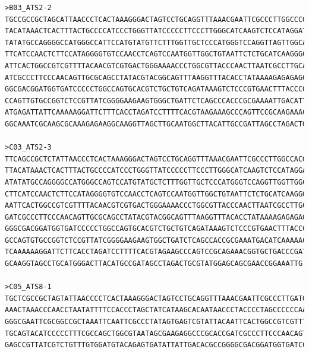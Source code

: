 \begin{verbatim}
>B03_ATS2-2
TGCCGCCGCTAGCATTAACCCTCACTAAAGGGACTAGTCCTGCAGGTTTAAACGAATTCGCCCTTGGCCCGCGTCGACTAGTACTTTTTTTTTTTTTTTTTGTGTTTGTCAAATCCCATT
TACATAAACTCACTTTACTGCCCCATCCCTGGGTTATCCCCCTTCCCTTGGGCATCAAGTCTCCATAGGATTAGGTTCATCCTCTCCCATTGAGGCTAGACAAAGCAGTTCTCTGCTACA
TATATGCCAGGGGCCATGGGCCATTCCATGTATGTTCTTTGGTTGCTCCCATGGGTCCAGGTTAGTTGGCACTGTTGGTTTTCCTATGGTAGTTGCCATCACCTTCAGTTCTTTCAATCC
TTCATCCAACTCTTCCATAGGGGTGTCCAACCTCAGTCCAATGGTTGGCTGTAATTCTCTGCATCAAGGGCAAATTCCCGGCCGCTAAATTCAATTCGCCCTATAGTGAGTCGTATTACA
ATTCACTGGCCGTCGTTTTACAACGTCGTGACTGGGAAAACCCTGGCGTTACCCAACTTAATCGCCTTGCAGCACATCCCCCTTTCGCCAGCTGGCGTAATAGCGAAAAGGCCCGCACCG
ATCGCCCTTCCCAACAGTTGCGCAGCCTATACGTACGGCAGTTTAAGGTTTACACCTATAAAAGAGAGAGCCGTTATCGTCTGTTTGTGGATGTACAGAGTGATATTATTGACACGCCGG
GGCGACGGATGGTGATCCCCCTGGCCAGTGCACGTCTGCTGTCAGATAAAGTCTCCCGTGAACTTTACCCGGTGGTGCATATCGGGGATGAAAGCTGGCGCATGATGACCACCGATATGG
CCAGTTGTGCCGGTCTCCGTTATCGGGGAAGAAGTGGGCTGATTCTCAGCCCACCCGCGAAAATTGACATTCAAAACGCCATTAACCCTGATTGTTTCTGGGAAATATAAATGGTCAGGC
ATGAGATTATTCAAAAAGGATTCTTTCACCTAGATCCTTTTCACGTAAGAAAGCCCAGTTCCGCAAGAAACGGGTGCTTGAACCCGGATGAATTGTTCAGCTTACTGGCTATTCTTGACA
GGCAAATCGCAAGCGCAAAGAGAAGGCAAGGTTAGCTTGCAATGGCTTACATTGCCGATTAGCCTAGACTGCGTTTTATGCACAGGCAAGCGAAACGGAAAATTGGCTCAG

>C03_ATS2-3
TTCAGCCGCTCTATTAACCCTCACTAAAGGGACTAGTCCTGCAGGTTTAAACGAATTCGCCCTTGGCCACGCGTCGACTAGTACTTTTTTTTTTTTTTTTTTGTGTTTGTCAAATCCCAT
TTACATAAACTCACTTTACTGCCCCATCCCTGGGTTATCCCCCTTCCCTTGGGCATCAAGTCTCCATAGGATTAGGTTCATCCTCTCCCATTGAGGCTAGACAAAGCAGTTCTCTGCTAC
ATATATGCCAGGGGCCATGGGCCAGTCCATGTATGCTCTTTGGTTGCTCCCATGGGTCCAGGTTGGTTGGCACTGTTGGTTTTCCTATGGTAGTTGCCATCACCTTCAGTTCTTTCAATC
CTTCATCCAACTCTTCCATAGGGGTGTCCAACCTCAGTCCAATGGTTGGCTGTAATTCTCTGCATCAAGGGCGAATTCGCGGCCGCTAAATTCAATTCGCCCTATAGTGAGTCGTATTAC
AATTCACTGGCCGTCGTTTTACAACGTCGTGACTGGGAAAACCCTGGCGTTACCCAACTTAATCGCCTTGCAGCACATCCCCCTTTCGCCAGCTGGCGTAATAGCGAAGAGGCCCGCACC
GATCGCCCTTCCCAACAGTTGCGCAGCCTATACGTACGGCAGTTTAAGGTTTACACCTATAAAAGAGAGAGCCGTTATCGTCTGTTTGTGGATGTACAGAGTGATATTATTGACACGCCG
GGGCGACGGATGGTGATCCCCCTGGCCAGTGCACGTCTGCTGTCAGATAAAGTCTCCCGTGAACTTTACCCGGTGGTGCATATCGGGGATGAAAGCTGGCGCATGATGACCACCGATATG
GCCAGTGTGCCGGTCTCCGTTATCGGGGAAGAAGTGGCTGATCTCAGCCACCGCGAAATGACATCAAAAACGCCATTTAACCTGATGTTCTGGGGAATATAAATGTCAGGCATGAGATTA
TCAAAAAAGGATTCTTCACCTAGATCCTTTTCACGTAGAAGCCCAGTCCGCAGAAACGGTGCTGACCCGATGAATGTCAGCTACTTGGCCTATCTGACAGGAAACGCAGCGCAAGAGAAA
GCAAGGTAGCCTGCATGGGACTTACATGCCGATAGCCTAGACTGCGTATGGAGCAGCGAACCGGAAATTG

>C05_ATS8-1
TGCTCGCCGCTAGTATTAACCCCTCACTAAAGGGACTAGTCCTGCAGGTTTAAACGAATTCGCCCTTGATGCAGAGAATTACAGCCAACAATAACTCAAAAATAATAACTCACCAAACAA
AAACTAAACCCAACCTAATATTTTCCACCCTAGCTATCATAAGCACAATAACCCTACCCCTAGCCCCCCAACTAATTACCTAAAAAAAAAAAAAAAAAGTACTAGTCGACGCGTGGCCAA
GGGCGAATTCGCGGCCGCTAAATTCAATTCGCCCTATAGTGAGTCGTATTACAATTCACTGGCCGTCGTTTTACAACGTCGTGACTGGGAAAACCCTGGCGTTACCCAACTTAATCGCCT
TGCAGTACATCCCCCTTTCGCCAGCTGGCGTAATAGCGAAGAGGCCCGCACCGATCGCCCTTCCCAACAGTTGCGCAGCCTATACGTACGGCAGTTTAAGGTTTACACCTATAAAAGAGA
GAGCCGTTATCGTCTGTTTGTGGATGTACAGAGTGATATTATTGACACGCCGGGGCGACGGATGGTGATCCCCCT


\end{verbatim}
